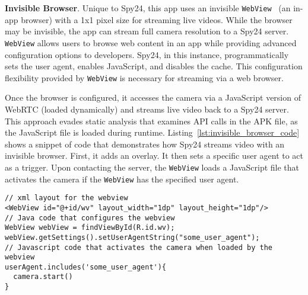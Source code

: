 \documentclass[sigconf,balance=false]{acmart}
\newcommand{\alex}[1]{\textcolor{chicagomaroon}{\noindent[AL: #1]}}
\newcommand{\geoff}[1]{\textcolor{purple}{\noindent[GV: #1]}}
\newcommand{\alex}[1]{}
\newcommand{\geoff}[1]{}
\providecommand{\DIFadd}[1]{{\protect\color{blue}\uwave{#1}}} %
\providecommand{\DIFaddbegin}{} %
\providecommand{\DIFaddend}{} %
\newcommand{\DIFaddincludegraphics}[2][]{{\color{blue}\fbox{\DIFOincludegraphics[#1]{#2}}}} %
\DeclareRobustCommand{\DIFaddbegin}{\DIFOaddbegin \let\includegraphics\DIFaddincludegraphics} %
\DeclareRobustCommand{\DIFaddend}{\DIFOaddend \let\includegraphics\DIFOincludegraphics} %
\begin{document}

\textbf{Invisible Browser}. Unique to Spy24, this app uses an invisible
\texttt{WebView}~\cite{WebViewA25:online} (an in-app browser) with a 1x1 pixel size for
streaming live videos. While the browser may be invisible, the app can stream
full camera resolution to a Spy24 server.
\texttt{WebView} allows users to browse web content in an app while providing advanced
configuration options to developers. Spy24, in this instance, programmatically sets
the user agent, enables JavaScript, and disables the cache. This configuration
flexibility provided by \texttt{WebView} is necessary for streaming via a web browser.

Once the browser is configured, it accesses the camera via a JavaScript version
of WebRTC (loaded dynamically) and streams live video back to a Spy24 server.
This approach evades static analysis that examines API calls in the APK file, as
the JavaScript file is loaded during runtime.
Listing~\ref{lst:invisible_browser_code} shows a snippet of code that
demonstrates how Spy24 streams video with an invisible browser. First, it adds \DIFaddbegin \DIFadd{the 1x1 }\texttt{\DIFadd{WebView}} \DIFadd{as }\DIFaddend an overlay.  It then sets a specific user
agent to act as a trigger. Upon contacting the server, the \texttt{WebView} loads a
JavaScript file that activates the camera if the \texttt{WebView} has the specified user
agent.

\vspace{0.3cm}
\hspace{-0.1\linewidth}
\begin{lstlisting}[basicstyle=\small\ttfamily,caption={Code snippet that demonstrates how Spy24 streams live videos},label={lst:invisible_browser_code},captionpos=b,float=t]
// xml layout for the webview
<WebView id="@+id/wv" layout_width="1dp" layout_height="1dp"/>
// Java code that configures the webview
WebView webView = findViewById(R.id.wv);
webView.getSettings().setUserAgentString("some_user_agent");
// Javascript code that activates the camera when loaded by the webview
userAgent.includes('some_user_agent'){
  camera.start()
}
\end{lstlisting}
\end{document}
